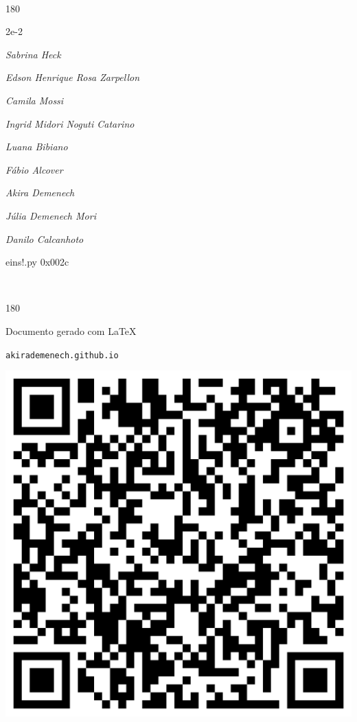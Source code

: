 \documentclass[12pt]{article}
\begin{document}
	\ 
	\vfill
	\begin{turn}{180}	
		\begin{minipage}{\textwidth}
		  	\ttfamily %
			\centering
			{\Huge 2e-2}
		  
			\hfill
		  
			

\textit{\small Sabrina Heck}

\textit{\small Edson Henrique Rosa Zarpellon}

\textit{\small Camila Mossi}

\textit{\small Ingrid Midori Noguti Catarino}

\textit{\small Luana Bibiano}

\textit{\small Fábio Alcover}

\textit{\small Akira Demenech}

\textit{\small Júlia Demenech Mori}

\textit{\small Danilo Calcanhoto}

\bigskip

eins!.py
0x002c


		\end{minipage}	
	\end{turn}
	\vfill
	\

\pagebreak

	\begin{turn}{180}	
		\begin{minipage}{\textwidth}		  
		  Documento gerado com \LaTeX			
		  
		  \texttt{akirademenech.github.io}

		  \includegraphics[height=0.3\textheight]{2e-2.pdf}

		\end{minipage}	
	\end{turn}  
		  
\end{document}

